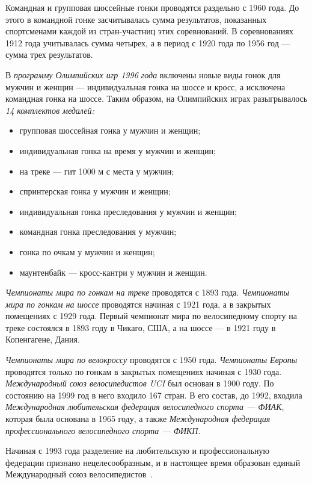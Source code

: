 Командная и групповая шоссейные гонки проводятся раздельно с 1960 года.
До этого в командной гонке засчитывалась сумма результатов, показанных спортсменами
каждой из стран-участниц этих соревнований. В соревнованиях 1912 года учитывалась
сумма четырех, а в период с 1920 года по 1956 год --- сумма трех результатов.

В \textit{программу Олимпийских игр 1996 года} включены новые виды гонок для мужчин и женщин ---
индивидуальная гонка на шоссе и кросс, а исключена командная гонка на шоссе.
Таким образом, на Олимпийских играх разыгрывалось \textit{14 комплектов медалей:}
\begin{itemize}
  \item групповая шоссейная гонка у мужчин и женщин;
  \item индивидуальная гонка на время у мужчин и женщин;
  \item на треке --- гит 1000 м с места у мужчин;
  \item спринтерская гонка у мужчин и женщин;
  \item индивидуальная гонка преследования у мужчин и женщин;
  \item командная гонка преследования у мужчин;
  \item гонка по очкам у мужчин и женщин;
  \item маунтенбайк --- кросс-кантри у мужчин и женщин.
\end{itemize}

\textit{Чемпионаты мира по гонкам на треке} проводятся с 1893 года.
\textit{Чемпионаты мира по гонкам на шоссе} проводятся начиная с 1921 года,
а в закрытых помещениях с 1929 года.
Первый чемпионат мира по велосипедному спорту на треке состоялся в 1893 году в Чикаго,
США, а на шоссе --- в 1921 году в Копенгагене, Дания.

\textit{Чемпионаты мира по велокроссу} проводятся с 1950 года.
\textit{Чемпионаты Европы} проводятся только по гонкам в закрытых помещениях
начиная с 1930 года.
\textit{Международный союз велосипедистов UCI} был основан в 1900 году.
По состоянию на 1999 год в него входило 167 стран. В его состав, до 1992, входила
\textit{Международная любительская федерация велосипедного спорта --- ФИАК},
которая была основана в 1965 году, а также \textit{Международная федерация
профессионального велосипедного спорта --- ФИКП}.

Начиная с 1993 года разделение на любительскую и профессиональную федерации
признано нецелесообразным, и в настоящее время образован единый Международный
союз велосипедистов~\cite{bicycle_sport_history}.

